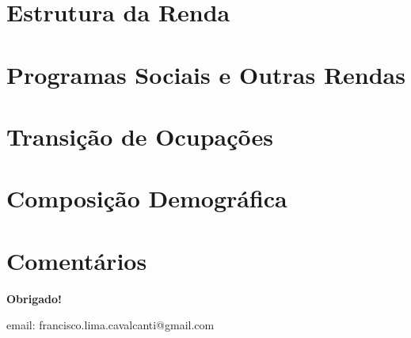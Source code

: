 \documentclass[11pt]{beamer}
\begin{document}


\section{Estrutura da Renda}



\section{Programas Sociais e Outras Rendas}



\section{Transição de Ocupações}



\section{Composição Demográfica}



\section{Comentários}


\frame
{
    \begin{center}
     \vfill
    \textbf{Obrigado!}
     \\

     \begin{small}
     email: francisco.lima.cavalcanti@gmail.com
     \end{small}
     \vfill
\end{center}
}
\end{document}
